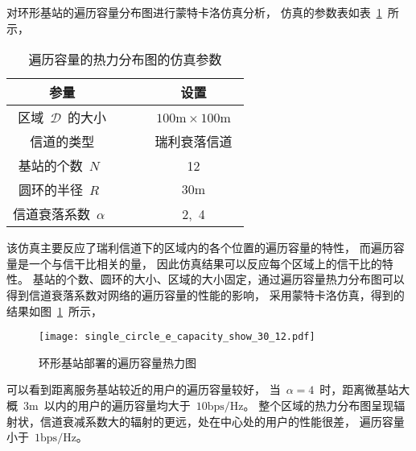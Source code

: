 对环形基站的遍历容量分布图进行蒙特卡洛仿真分析，
仿真的参数表如表~\ref{single_circle_sinr_sim_para}~所示，
\begin{table}[htbp]
\caption{遍历容量的热力分布图的仿真参数}
\label{single_circle_sinr_sim_para}
\vspace{0.5em}\centering\wuhao
\begin{tabular}{cccc}
\toprule[1.5pt]
参量 & & & 设置 \\
\midrule[0.5pt]
区域~$\mathcal{D}$~的大小  & & & ~$100\mathrm{m} \times 100 \mathrm{m}$~ \\
信道的类型 & & &  瑞利衰落信道\\
基站的个数~$N$~ & & &  12\\
圆环的半径~$R$~ & & &  ${30\mathrm{m}}$\\
信道衰落系数~$\alpha$~  & & & 2,~4\\
\bottomrule[1.5pt]
\end{tabular}
\end{table}
该仿真主要反应了瑞利信道下的区域内的各个位置的遍历容量的特性，
而遍历容量是一个与信干比相关的量，
因此仿真结果可以反应每个区域上的信干比的特性。
基站的个数、圆环的大小、区域的大小固定，通过遍历容量热力分布图可以得到信道衰落系数对网络的遍历容量的性能的影响，
采用蒙特卡洛仿真，得到的结果如图~\ref{single_circle_e_capacity_show}~所示，
\begin{figure}[htbp]
\centering
\texttt{[image: single\_circle\_e\_capacity\_show\_30\_12.pdf]}
\caption{环形基站部署的遍历容量热力图}\vspace{-0.5em}
\label{single_circle_e_capacity_show}
\end{figure}
可以看到距离服务基站较近的用户的遍历容量较好，
当~$\alpha=4$~时，距离微基站大概~$3\mathrm{m}$~以内的用户的遍历容量均大于~$10\mathrm{bps/Hz}$。
整个区域的热力分布图呈现辐射状，信道衰减系数大的辐射的更远，处在中心处的用户的性能很差，
遍历容量小于~$1\mathrm{bps/Hz}$。

